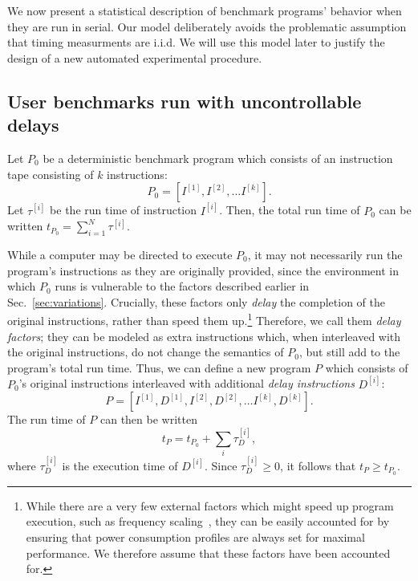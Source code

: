 \documentclass[conference]{IEEEtran}
\begin{document}
We now present a statistical description of benchmark programs' behavior
when they are run in serial. Our model deliberately avoids the problematic
assumption that timing measurments are i.i.d. We will use this model later to
justify the design of a new automated experimental procedure.

\subsection{User benchmarks run with uncontrollable delays}
\label{sec:programmodel}

Let $P_0$ be a deterministic benchmark program which consists of an instruction tape
consisting of $k$ instructions:
%
\begin{equation}
    P_0 = \left[I^{[1]}, I^{[2]}, \dots I^{[k]}\right].
\end{equation}
%
Let $\tau^{[i]}$ be the run time of instruction $I^{[i]}$. Then, the total run
time of $P_0$ can be written $t_{P_0} = \sum_{i=1}^N \tau^{[i]}$.

While a computer may be directed to execute $P_0$, it may not necessarily run the program's
instructions as they are originally provided, since the environment in which $P_0$
runs is vulnerable to the factors described earlier in Sec.~\ref{sec:variations}. Crucially,
these factors only \textit{delay} the completion of the original instructions, rather than
speed them up.\footnote{While there are a very few external factors which might speed up
program execution, such as frequency scaling~\cite{RHEL6}, they can be easily accounted for
by ensuring that power consumption profiles are always set for maximal performance. We
therefore assume that these factors have been accounted for.} Therefore, we call them
\textit{delay factors}; they can be modeled as extra instructions which, when
interleaved with the original instructions, do not change the semantics of
$P_0$, but still add to the program's total run time. Thus, we can define a new
program $P$ which consists of $P_0$'s original instructions interleaved with
additional \textit{delay instructions} $D^{[i]}$:
%
\begin{equation}
    P = \left[I^{[1]}, D^{[1]}, I^{[2]}, D^{[2]}, \dots I^{[k]}, D^{[k]}\right].
\end{equation}
%
The run time of $P$ can then be written
%
\begin{equation}
    t_P = t_{P_0} + \sum_{i} \tau^{[i]}_D,
\end{equation}
%
where $\tau^{[i]}_D$ is the execution time of $D^{[i]}$. Since $\tau^{[i]}_D \ge 0$, it
follows that $t_P \ge t_{P_0}$.
\end{document}
